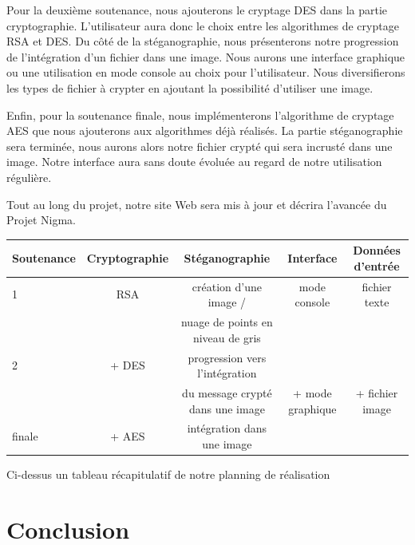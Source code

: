\documentclass[a4paper,12pt]{article}
\begin{document}
Pour la deuxième soutenance, nous ajouterons le cryptage DES dans la partie cryptographie. L'utilisateur aura donc le choix entre les algorithmes de cryptage RSA et DES. Du côté de la stéganographie, nous présenterons notre progression de l'intégration d'un fichier dans une image. Nous aurons une interface graphique ou une utilisation en mode console au choix pour l'utilisateur. Nous diversifierons les types de fichier à crypter en ajoutant la possibilité d'utiliser une image.

Enfin, pour la soutenance finale, nous implémenterons l'algorithme de cryptage AES que nous ajouterons aux algorithmes déjà réalisés. La partie stéganographie sera terminée, nous aurons alors notre fichier crypté qui sera incrusté dans une image. Notre interface aura sans doute évoluée au regard de notre utilisation régulière.

Tout au long du projet, notre site Web sera mis à jour et décrira l'avancée du Projet Nigma.

\bigskip

\begin{landscape}
  \begin{tabular}{|l|c|c|c|c|}
    \hline
    Soutenance & Cryptographie & Stéganographie                    & Interface        & Données d'entrée \\ \hline \hline
    1          & RSA           & création d'une image /            & mode console     & fichier texte    \\
    &               & nuage de points en niveau de gris &                  &                  \\ \hline
    2          & + DES         & progression vers l'intégration    &                  &                  \\
    &               & du message crypté dans une image  & + mode graphique & + fichier image  \\ \hline
    finale     & + AES         & intégration dans une image        &                  &                  \\ \hline
  \end{tabular}
  \begin{center}
    Ci-dessus un tableau récapitulatif de notre planning de réalisation
  \end{center}
\end{landscape}
\newpage

\part{Conclusion}
\end{document}
